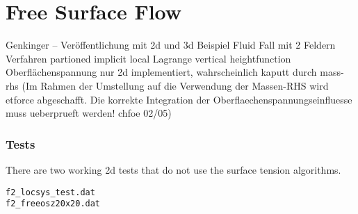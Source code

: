 \chapter{Free Surface Flow}


Genkinger – Veröffentlichung mit 2d und 3d Beispiel
Fluid Fall mit 2 Feldern
Verfahren
partioned implicit local Lagrange
vertical heightfunction
Oberflächenspannung nur 2d implementiert, wahrscheinlich kaputt durch mass-rhs
(Im Rahmen der Umstellung auf die Verwendung der Massen-RHS wird etforce abgeschafft. Die korrekte Integration der
            Oberflaechenspannungseinfluesse muss ueberprueft werden!   chfoe 02/05)


\subsection{Tests}

There are two working 2d tests that do not use the surface tension algorithms.

\begin{verbatim}
f2_locsys_test.dat 
f2_freeosz20x20.dat
\end{verbatim}
